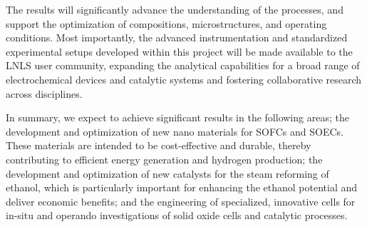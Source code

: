 The results will significantly advance the understanding of the processes, and support the optimization of compositions, microstructures, and operating conditions. Most importantly, the advanced instrumentation and standardized experimental setups developed within this project will be made available to the LNLS user community, expanding the analytical capabilities for a broad range of electrochemical devices and catalytic systems and fostering collaborative research across disciplines.

In summary, we expect to achieve significant results in the following areas; the development and optimization of new nano materials for SOFCs and SOECs. These materials are intended to be cost-effective and durable, thereby contributing to efficient energy generation and hydrogen production; the development and optimization of new catalysts for the steam reforming of ethanol, which is particularly important for enhancing the ethanol potential and deliver economic benefits; and the engineering of specialized, innovative cells for in-situ and operando investigations of solid oxide cells and catalytic processes.
